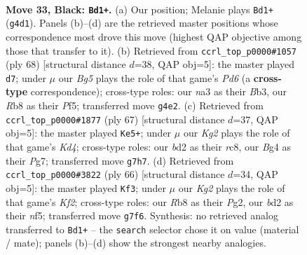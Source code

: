 \documentclass[11pt]{article}
\begin{document}
\clearpage

\begin{figure}[p]\centering
\begin{subfigure}{0.46\textwidth}\centering
\resizebox{\linewidth}{!}{%
\newchessgame
\chessboard[
  setfen={1r6/pp4k1/8/2p3r1/4p1b1/N3P3/PP1B2K1/R7 b - - 1 33},
  showmover=false,
  pgfstyle=straightmove, color=movearrow, markmove={g4-d1}
]}
\caption{}
\end{subfigure}\hfill
\begin{subfigure}{0.46\textwidth}\centering
\resizebox{\linewidth}{!}{%
\newchessgame
\chessboard[
  setfen={1r3k2/8/3P3p/2p2P2/1p6/1B4bP/6P1/5R1K w - - 2 35},
  showmover=false,
  pgfstyle=straightmove, color=movearrow, markmove={d6-d7}
]}
\caption{}
\end{subfigure}
\\[4pt]
\begin{subfigure}{0.46\textwidth}\centering
\resizebox{\linewidth}{!}{%
\newchessgame
\chessboard[
  setfen={2R5/p2r2pp/1p6/3k4/P7/3KP2P/6P1/8 b - - 4 34},
  showmover=false,
  pgfstyle=straightmove, color=movearrow, markmove={d5-e5}
]}
\caption{}
\end{subfigure}\hfill
\begin{subfigure}{0.46\textwidth}\centering
\resizebox{\linewidth}{!}{%
\newchessgame
\chessboard[
  setfen={6k1/1p1N3p/2r3p1/5n2/p7/7P/PP1R1KP1/8 w - - 6 34},
  showmover=false,
  pgfstyle=straightmove, color=movearrow, markmove={f2-f3}
]}
\caption{}
\end{subfigure}
\caption{\textbf{Move 33, Black: \texttt{Bd1+}.} (a) Our position; Melanie plays \texttt{Bd1+} (\texttt{g4d1}). Panels (b)--(d) are the retrieved master positions whose correspondence most drove this move (highest QAP objective among those that transfer to it). (b) Retrieved from \texttt{ccrl\_top\_p0000\#1057} (ply 68) [structural distance $d$=38, QAP obj=5]: the master played \texttt{d7}; under $\mu$ our \emph{Bg5} plays the role of that game's \emph{Pd6} (a \textbf{cross-type} correspondence); cross-type roles: our \emph{n}a3 as their \emph{B}b3, our \emph{R}b8 as their \emph{P}f5; transferred move \texttt{g4e2}. (c) Retrieved from \texttt{ccrl\_top\_p0000\#1877} (ply 67) [structural distance $d$=37, QAP obj=5]: the master played \texttt{Ke5+}; under $\mu$ our \emph{Kg2} plays the role of that game's \emph{Kd4}; cross-type roles: our \emph{b}d2 as their \emph{r}c8, our \emph{B}g4 as their \emph{P}g7; transferred move \texttt{g7h7}. (d) Retrieved from \texttt{ccrl\_top\_p0000\#3822} (ply 66) [structural distance $d$=34, QAP obj=5]: the master played \texttt{Kf3}; under $\mu$ our \emph{Kg2} plays the role of that game's \emph{Kf2}; cross-type roles: our \emph{R}b8 as their \emph{P}g2, our \emph{b}d2 as their \emph{n}f5; transferred move \texttt{g7f6}. Synthesis: no retrieved analog transferred to \texttt{Bd1+} -- the \texttt{search} selector chose it on value (material / mate); panels (b)--(d) show the strongest nearby analogies.}
\label{fig:thought-m65}
\end{figure}
\end{document}
